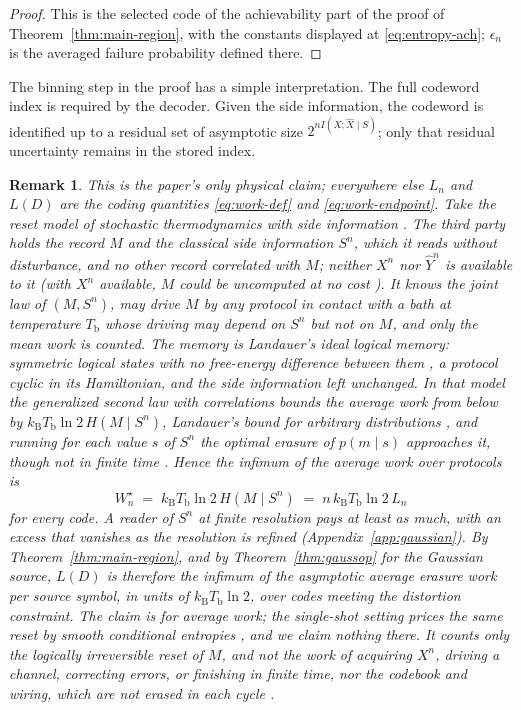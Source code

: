 \documentclass[11pt,onecolumn]{IEEEtran}
\newtheorem{remark}[theorem]{Remark}
\newcommand{\hX}{\widehat{X}}
\newcommand{\hY}{\widehat{Y}}
\newcommand{\kb}{k_{\mathrm{B}}}
\begin{document}
\begin{proof}
This is the selected code of the achievability part of the proof of
Theorem~\ref{thm:main-region}, with the constants displayed at
\eqref{eq:entropy-ach}; $\epsilon_n$ is the averaged failure
probability defined there.
\end{proof}

The binning step in the proof has a simple interpretation. The full codeword
index is required by the decoder. Given the side information, the codeword
is identified up to a residual set of asymptotic size $2^{nI(X;\hX\mid S)}$; only
that residual uncertainty remains in the stored index.

\begin{remark}\label{rem:thermo}
This is the paper's only physical claim; everywhere else $L_n$ and $L(D)$
are the coding quantities \eqref{eq:work-def} and \eqref{eq:work-endpoint}.
Take the reset model of stochastic thermodynamics with side information
\cite{sagawa2012,parrondo2015}. The third party holds the record $M$ and
the classical side information $S^n$, which it reads without disturbance,
and no other record correlated with $M$; neither $X^n$ nor $\hY^n$ is
available to it (with $X^n$ available, $M$ could be uncomputed at no cost
\cite{bennett1973}). It knows the joint law of $(M,S^n)$, may drive $M$ by
any protocol in contact with a bath at temperature $T_{\mathrm b}$ whose
driving may depend on $S^n$ but not on $M$, and only the mean work is
counted. The memory is Landauer's ideal logical memory: symmetric logical
states with no free-energy difference between them \cite{sagawa2009}, a
protocol cyclic in its Hamiltonian, and the side information left
unchanged. In that model the generalized second law with correlations
\cite{sagawa2012,parrondo2015} bounds the average work from below by
$\kb T_{\mathrm b}\ln2\,H(M\mid S^n)$, Landauer's bound for arbitrary
distributions \cite{landauer1961,esposito2011}, and running for each value
$s$ of $S^n$ the optimal erasure of $p(m\mid s)$ approaches it, though not
in finite time \cite{esposito2011}. Hence the infimum of the average work
over protocols is
\begin{equation}
 W_n^{\star}\;=\;\kb T_{\mathrm b}\ln2\,H(M\mid S^n)\;=\;n\,\kb T_{\mathrm b}\ln2\,L_n
 \label{eq:landauer-bound}
\end{equation}
for every code. A reader of $S^n$ at finite resolution pays at least as
much, with an excess that vanishes as the resolution is refined
(Appendix~\ref{app:gaussian}). By Theorem~\ref{thm:main-region}, and by
Theorem~\ref{thm:gaussop} for the Gaussian source, $L(D)$ is therefore the
infimum of the asymptotic average erasure work per source symbol, in
units of $\kb T_{\mathrm b}\ln2$, over codes meeting the distortion
constraint. The claim is for average work; the single-shot setting
prices the same reset by smooth conditional entropies
\cite{delrio2011,faist2015}, and we claim nothing there. It counts only
the logically irreversible reset of $M$, and not the work of acquiring
$X^n$, driving a channel, correcting errors, or finishing in finite time,
nor the codebook and wiring, which are not erased in each cycle
\cite{bennett1973,landauer1961}.
\end{remark}
\end{document}
